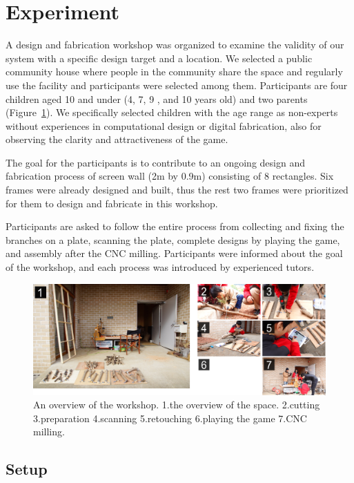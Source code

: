 \section{Experiment}
A design and fabrication workshop was organized to examine the validity of our system with a specific design target and a location.
We selected a public community house where people in the community share the space and regularly use the facility and participants were selected among them.
Participants are four children aged 10 and under (4, 7, 9 , and 10 years old) and two parents (Figure~\ref{fig:workshop}).
We specifically selected children with the age range as non-experts without experiences in computational design or digital fabrication, also for observing the clarity and attractiveness of the game.

The goal for the participants is to contribute to an ongoing design and fabrication process of screen wall (2m by 0.9m) consisting of 8 rectangles.
Six frames were already designed and built, thus the rest two frames were prioritized for them to design and fabricate in this workshop.

Participants are asked to follow the entire process from collecting and fixing the branches on a plate, scanning the plate, complete designs by playing the game, and assembly after the CNC milling.
Participants were informed about the goal of the workshop, and each process was introduced by experienced tutors.

\begin{figure}[ht]
  \begin{center}
    \includegraphics[width = 0.4\paperwidth]{images/fabrication/workshop_setup.png}
    \caption{An overview of the workshop. 1.the overview of the space. 2.cutting 3.preparation 4.scanning 5.retouching 6.playing the game 7.CNC milling.}
    \label{fig:workshop}
  \end{center}
\end{figure}

\subsection{Setup}
